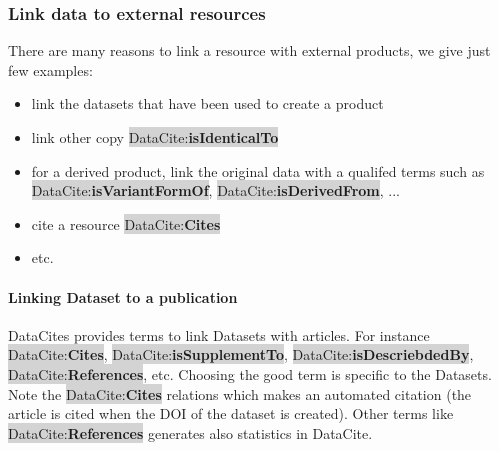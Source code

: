\documentclass[11pt,a4paper]{ivoa}
\newcommand{\dataciteterm}[1]{\colorbox{lightgray}{DataCite:\textbf{#1}}}
\begin{document}

\subsubsection{Link data to external resources}
There are many reasons to link a resource with external products, we give just few examples:

\begin{itemize}
	\item link the datasets that have been used to create a product 
	\item link other copy \dataciteterm{isIdenticalTo}
	\item for a derived product, link the original data with a qualifed terms such as \dataciteterm{isVariantFormOf}, \dataciteterm{isDerivedFrom}, ...
	\item cite a resource \dataciteterm{Cites}
	\item etc.
\end{itemize}



\paragraph{Linking Dataset to a publication}
DataCites provides terms to link Datasets with articles. For instance \dataciteterm{Cites}, \dataciteterm{isSupplementTo}, \dataciteterm{isDescriebdedBy}, \dataciteterm{References}, etc.
Choosing the good term is specific to the Datasets. \\


Note the \dataciteterm{Cites} relations which makes an automated citation (the article is cited when the DOI of the dataset is created). 
Other terms like \dataciteterm{References} generates also statistics in DataCite.



\end{document}
